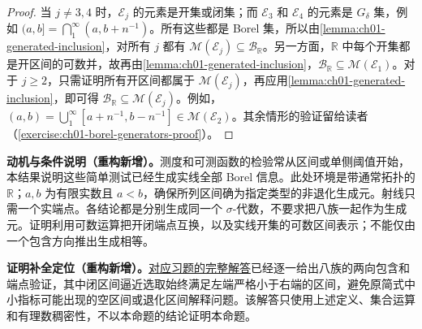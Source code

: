 \documentclass[../../main.tex]{subfiles}%
\begin{document}
\begin{proof}
当 $j\ne3,4$ 时，$\mathscr{E}_j$ 的元素是开集或闭集；而 $\mathscr{E}_3$ 和 $\mathscr{E}_4$ 的元素是 $G_\delta$ 集，例如 $(a,b]=\bigcap_1^\infty(a,b+n^{-1})$。所有这些都是 Borel 集，所以由\cref{lemma:ch01-generated-inclusion}，对所有 $j$ 都有 $\mathscr{M}(\mathscr{E}_j)\subseteq\mathscr{B}_{\mathbb{R}}$。另一方面，$\mathbb{R}$ 中每个开集都是开区间的可数并，故再由\cref{lemma:ch01-generated-inclusion}，$\mathscr{B}_{\mathbb{R}}\subseteq\mathscr{M}(\mathscr{E}_1)$。对于 $j\geqslant2$，只需证明所有开区间都属于 $\mathscr{M}(\mathscr{E}_j)$，再应用\cref{lemma:ch01-generated-inclusion}，即可得 $\mathscr{B}_{\mathbb{R}}\subseteq\mathscr{M}(\mathscr{E}_j)$。例如，$(a,b)=\bigcup_1^\infty[a+n^{-1},b-n^{-1}]\in\mathscr{M}(\mathscr{E}_2)$。其余情形的验证留给读者（\cref{exercise:ch01-borel-generators-proof}）。
\end{proof}
\begin{remark}
\textbf{动机与条件说明（重构新增）。}测度和可测函数的检验常从区间或单侧阈值开始，本结果说明这些简单测试已经生成实线全部 Borel 信息。此处环境是带通常拓扑的 $\mathbb{R}$；$a,b$ 为有限实数且 $a<b$，确保所列区间确为指定类型的非退化生成元。射线只需一个实端点。各结论都是分别生成同一个 $\sigma$-代数，不要求把八族一起作为生成元。证明利用可数运算把开闭端点互换，以及实线开集的可数区间表示；不能仅由一个包含方向推出生成相等。

\textbf{证明补全定位（重构新增）。}\hyperref[solution:ch01-borel-generators-proof]{对应习题的完整解答}已经逐一给出八族的两向包含和端点验证，其中闭区间逼近选取始终满足左端严格小于右端的区间，避免原简式中小指标可能出现的空区间或退化区间解释问题。该解答只使用上述定义、集合运算和有理数稠密性，不以本命题的结论证明本命题。
\end{remark}


\end{document}
